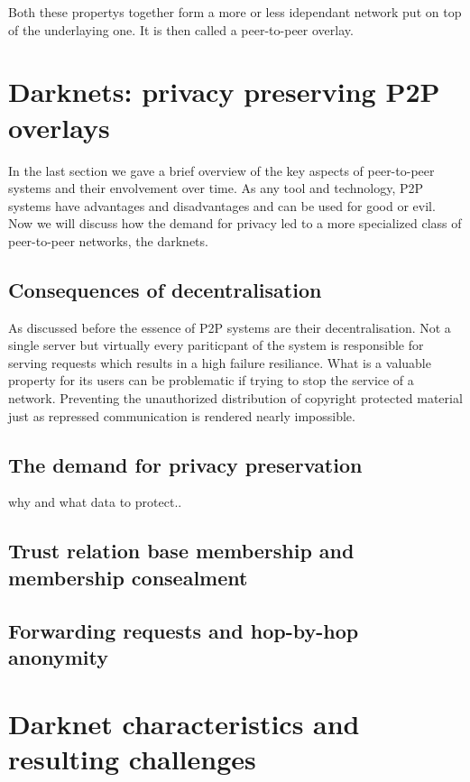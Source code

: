Both these propertys together form a more or less idependant network put on top of the underlaying one. It is then called a peer-to-peer overlay.


\section{Darknets: privacy preserving P2P overlays}

In the last section we gave a brief overview of the key aspects of peer-to-peer systems and their envolvement over time. As any tool and technology, P2P systems have advantages and disadvantages and can be used for good or evil. Now we will discuss how the demand for privacy led to a more specialized class of peer-to-peer networks, the darknets.

\subsection{Consequences of decentralisation}

As discussed before the essence of P2P systems are their decentralisation. Not a single server but virtually every pariticpant of the system is responsible for serving requests which results in a high failure resiliance. What is a valuable property for its users can be problematic if trying to stop the service of a network. Preventing the unauthorized distribution of copyright protected material just as repressed communication is rendered nearly impossible. 

\subsection{The demand for privacy preservation}

why and what data to protect..

\subsection{Trust relation base membership and membership consealment}

\subsection{Forwarding requests and hop-by-hop anonymity}


\section{Darknet characteristics and resulting challenges}

